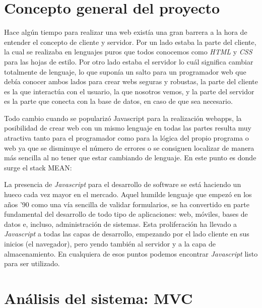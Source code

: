 \section{Concepto general del proyecto}\label{teorico-general}
Hace algún tiempo para realizar una web existía una gran barrera a la hora de entender el concepto de cliente y servidor. Por un lado estaba la parte del cliente, la cual se realizaba en lenguajes puros que todos conocemos como \emph{HTML} y \emph{CSS} para las hojas de estilo. Por otro lado estaba el servidor lo cuál significa cambiar totalmente de lenguaje, lo que suponía un salto para un programador web que debía conocer ambos lados para crear webs seguras y robustas, la parte del cliente es la que interactúa con el usuario, la que nosotros vemos, y la parte del servidor es la parte que conecta con la base de datos, en caso de que sea necesario.

Todo cambio cuando se popularizó Javascript para la realización webapps, la posibilidad de crear web con un mismo lenguaje en todas las partes resulta muy atractiva tanto para el programador como para la lógica del propio programa o web ya que se disminuye el número de errores o se consiguen localizar de manera más sencilla al no tener que estar cambiando de lenguaje. En este punto es donde surge el stack MEAN:




La presencia de \emph{Javascript} para el desarrollo de software se está haciendo un hueco cada vez mayor en el mercado. Aquel humilde lenguaje que empezó en los años '90 como una vía sencilla de validar formularios, se ha convertido en parte fundamental del desarrollo de todo tipo de aplicaciones: web, móviles, bases de datos e, incluso, administración de sistemas. Esta proliferación ha llevado a  \emph{Javascript} a todas las capas de desarrollo, empezando por el lado cliente en sus inicios (el navegador), pero yendo también al servidor y a la capa de almacenamiento. En cualquiera de esos puntos podemos encontrar  \emph{Javascript} listo para ser utilizado.







\section{Análisis del sistema: MVC}\label{analisis-sistema-mvc}

